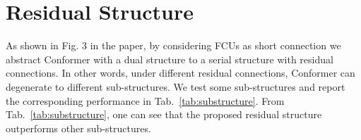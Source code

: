 \documentclass[10pt,twocolumn,letterpaper]{article}
\begin{document}
\begin{table}[t]
    \centering
    \caption{Comparison of inference time. FPS is measured on a 32GB V100 GPU with batchsize 1.}
    \label{tab:fps}
\end{table}


\section{Residual Structure}
As shown in Fig. 3 in the paper, by considering FCUs as short connection we abstract Conformer with a dual structure to a serial structure with residual connections. 
In other words, under different residual connections, Conformer can degenerate to different sub-structures. We test some sub-structures and report the corresponding performance in Tab.~\ref{tab:substructure}.
From Tab.~\ref{tab:substructure}, one can see that the proposed residual structure outperforms other  sub-structures.
\begin{table}[h]
    \centering
    \caption{Performance of Conformer sub-structures. Where the index 1, 2, 3 and 4 respectively represent the sub-structures shown in Figs. 3(b), (c), (d) and (e).}
    \label{tab:substructure}
\end{table}
\end{document}
